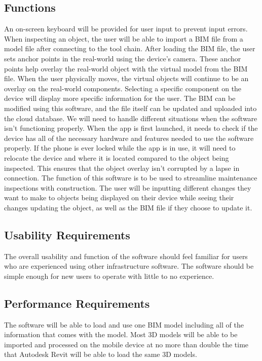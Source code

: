 \documentclass[onecolumn, draftclsnofoot,10pt, compsoc]{IEEEtran}
\begin{document}
    \subsection{Functions}
        An on-screen keyboard will be provided for user input to prevent input errors. When inspecting an object, the user will be able to import a BIM file from a model file after connecting to the tool chain. After loading the BIM file, the user sets anchor points in the real-world using the device's camera. These anchor points help overlay the real-world object with the virtual model from the BIM file. When the user physically moves, the virtual objects will continue to be an overlay on the real-world components. Selecting a specific component on the device will display more specific information for the user. The BIM can be modified using this software, and the file itself can be updated and uploaded into the cloud database. 
        We will need to handle different situations when the software isn't functioning properly. When the app is first launched, it needs to check if the device has all of the necessary hardware and features needed to use the software properly. If the phone is ever locked while the app is in use, it will need to relocate the device and where it is located compared to the object being inspected. This ensures that the object overlay isn't corrupted by a lapse in connection.
        The function of this software is to be used to streamline maintenance inspections with construction. The user will be inputting different changes they want to make to objects being displayed on their device while seeing their changes updating the object, as well as the BIM file if they choose to update it.
        
    \subsection{Usability Requirements}
        The overall usability and function of the software should feel familiar for users who are experienced using other infrastructure software. The software should be simple enough for new users to operate with little to no experience.
    \subsection{Performance Requirements}
        The software will be able to load and use one BIM model including all of the information that comes with the model. Most 3D models will be able to be imported and processed on the mobile device at no more than double the time that Autodesk Revit will be able to load the same 3D models. 
\end{document}
